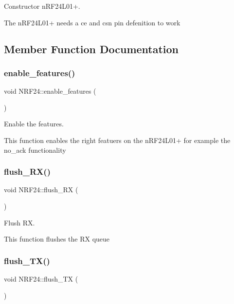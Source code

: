 Constructor n\+R\+F24\+L01+. 

The n\+R\+F24\+L01+ needs a ce and csn pin defenition to work 

\subsection{Member Function Documentation}
\mbox{\label{classNRF24_a12b6526fe059ca63ecd9ecda7f4099c8}} 
\subsubsection{\texorpdfstring{enable\+\_\+features()}{enable\_features()}}
{\footnotesize\ttfamily void N\+R\+F24\+::enable\+\_\+features (\begin{DoxyParamCaption}{ }\end{DoxyParamCaption})\hspace{0.3cm}{\ttfamily [protected]}}



Enable the features. 

This function enables the right featuers on the n\+R\+F24\+L01+ for example the no\+\_\+ack functionality \mbox{\label{classNRF24_af2837ae132e4513f0b3c08ad4389243a}} 
\subsubsection{\texorpdfstring{flush\+\_\+\+R\+X()}{flush\_RX()}}
{\footnotesize\ttfamily void N\+R\+F24\+::flush\+\_\+\+RX (\begin{DoxyParamCaption}{ }\end{DoxyParamCaption})\hspace{0.3cm}{\ttfamily [protected]}}



Flush RX. 

This function flushes the RX queue \mbox{\label{classNRF24_ae1be2e84f708565766cbf162f2efcd42}} 
\subsubsection{\texorpdfstring{flush\+\_\+\+T\+X()}{flush\_TX()}}
{\footnotesize\ttfamily void N\+R\+F24\+::flush\+\_\+\+TX (\begin{DoxyParamCaption}{ }\end{DoxyParamCaption})\hspace{0.3cm}{\ttfamily [protected]}}



